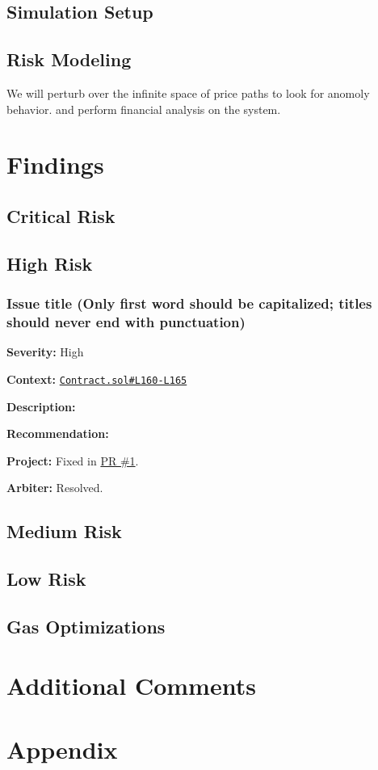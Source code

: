 \documentclass[14pt]{extarticle}
\begin{document}

\subsection{Simulation Setup}\label{simulation-setup}

\subsection{Risk Modeling}\label{risk-modeling}

We will perturb over the infinite space of price paths to look for anomoly behavior. and perform financial analysis on the system.

\section{Findings}\label{findings}

\subsection{Critical Risk}\label{critical-risk}

\subsection{High Risk}\label{high-risk}

\subsubsection{Issue title (Only first word should be capitalized;
titles should never end with
punctuation)}\label{issue-title-only-first-word-should-be-capitalized-titles-should-never-end-with-punctuation}

\textbf{Severity:} High

\textbf{Context:}
\href{https://github.com/actuallink}{\texttt{Contract.sol\#L160-L165}}

\textbf{Description:}


\textbf{Recommendation:}


\textbf{Project:} Fixed in \href{Https://github.com/actuallink}{PR \#1}.

\textbf{Arbiter:} Resolved.

\subsection{Medium Risk}\label{medium-risk}

\subsection{Low Risk}\label{low-risk}

\subsection{Gas Optimizations}\label{gas-optimizations}

\section{Additional Comments}\label{additional-comments}

\section{Appendix}\label{appendix}
\end{document}
